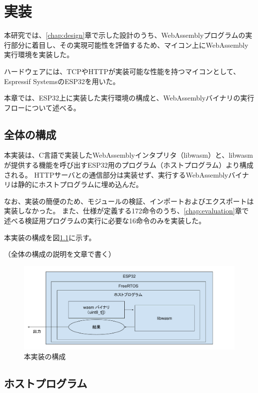 \chapter{実装}
\label{chap:implementation}

本研究では、\ref{chap:design}章で示した設計のうち、WebAssemblyプログラムの実行部分に着目し、その実現可能性を評価するため、マイコン上にWebAssembly実行環境を実装した。

ハードウェアには、TCPやHTTPが実装可能な性能を持つマイコンとして、Espressif SystemsのESP32\cite{esp32}を用いた。

本章では、ESP32上に実装した実行環境の構成と、WebAssemblyバイナリの実行フローについて述べる。

\section{全体の構成}

本実装は、C言語で実装したWebAssemblyインタプリタ（libwasm）と、libwasmが提供する機能を呼び出すESP32用のプログラム（ホストプログラム）より構成される。
HTTPサーバとの通信部分は実装せず、実行するWebAssemblyバイナリは静的にホストプログラムに埋め込んだ。

なお、実装の簡便のため、モジュールの検証、インポートおよびエクスポートは実装しなかった。
また、仕様が定義する172命令のうち、\ref{chap:evaluation}章で述べる検証用プログラムの実行に必要な16命令のみを実装した。

本実装の構成を図\ref{fig:esp32_libwasm}に示す。

（全体の構成の説明を文章で書く）

\begin{figure}[htbp]
  \caption{本実装の構成}
  \label{fig:esp32_libwasm}
  \begin{center}
    \includegraphics[bb=0 0 720 285,width=15cm]{img/esp32_libwasm.pdf}
  \end{center}
\end{figure}

\section{ホストプログラム}

